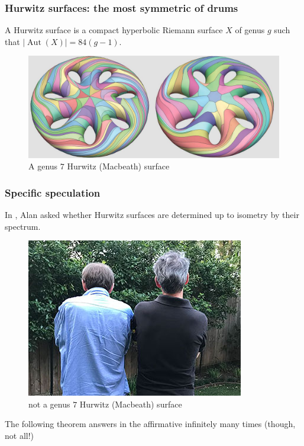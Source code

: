 \documentclass{beamer}
\begin{document}
\begin{frame}
	\frametitle{Hurwitz surfaces: the most symmetric of drums}
	A Hurwitz surface is a compact hyperbolic Riemann surface $X$ of genus $g$ such that $|\operatorname{Aut}(X)| = 84(g-1)$. 
	\pause 	
	\begin{center}
		\begin{figure}
		\includegraphics[scale=.18]{vanWijkGenus7.jpg}
			\caption{A genus $7$ Hurwitz (Macbeath) surface 
				\cite{vanwijk2009}}
		\end{figure}
	\end{center}
\end{frame}


\begin{frame}
	\frametitle{Specific speculation}
	\bigskip
	  In \cite{reid2014},  Alan asked whether Hurwitz surfaces are determined up to isometry by their spectrum. 
	\pause
	\begin{figure}
		\includegraphics[scale=.4]{Alan_Darren.jpeg}
			\caption{not a genus $7$ Hurwitz (Macbeath) surface}
		\end{figure}
	The following theorem answers in the affirmative infinitely many times (though, not all!)
\end{frame}
\end{document}
